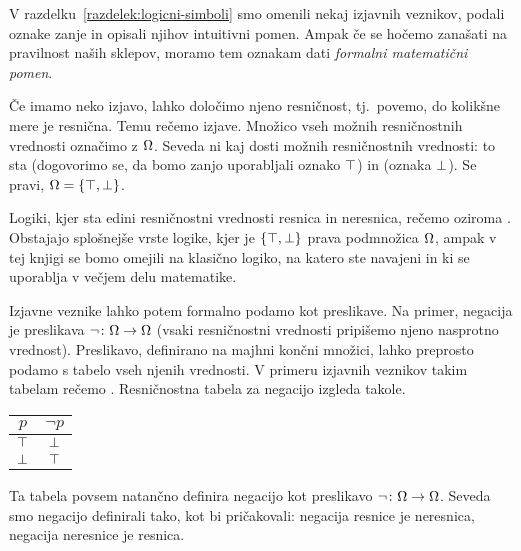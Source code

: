                 V razdelku~\ref{razdelek:logicni-simboli} smo omenili nekaj izjavnih veznikov, podali oznake zanje in opisali njihov intuitivni pomen. Ampak če se hočemo zanašati na pravilnost naših sklepov, moramo tem oznakam dati \emph{formalni matematični pomen}.

                Če imamo neko izjavo, lahko določimo njeno resničnost, tj.~povemo, do kolikšne mere je resnična. Temu rečemo  izjave. Množico vseh možnih resničnostnih vrednosti označimo z $\Omega$. Seveda ni kaj dosti možnih resničnostnih vrednosti: to sta  (dogovorimo se, da bomo zanjo uporabljali oznako $\top$) in  (oznaka $\bot$). Se pravi, $\tvs = \set{\true, \false}$.

                \begin{opomba}
                        Logiki, kjer sta edini resničnostni vrednosti resnica in neresnica, rečemo  oziroma . Obstajajo splošnejše vrste logike, kjer je $\set{\true, \false}$ prava podmnožica $\Omega$, ampak v tej knjigi se bomo omejili na klasično logiko, na katero ste navajeni in ki se uporablja v večjem delu matematike.
                \end{opomba}


                Izjavne veznike lahko potem formalno podamo kot preslikave. Na primer, negacija je preslikava $\lnot\colon \Omega \to \Omega$ (vsaki resničnostni vrednosti pripišemo njeno nasprotno vrednost). Preslikavo, definirano na majhni končni množici, lahko preprosto podamo s tabelo vseh njenih vrednosti. V primeru izjavnih veznikov takim tabelam rečemo . Resničnostna tabela za negacijo izgleda takole.
                \begin{center}
                        \begin{tabular}{c|c}
                                $p$ & $\lnot{p}$ \\
                                \hline
                                $\top$ & $\bot$ \\
                                $\bot$ & $\top$
                        \end{tabular}
                \end{center}
                Ta tabela povsem natančno definira negacijo kot preslikavo $\lnot\colon \Omega \to \Omega$. Seveda smo negacijo definirali tako, kot bi pričakovali: negacija resnice je neresnica, negacija neresnice je resnica.

